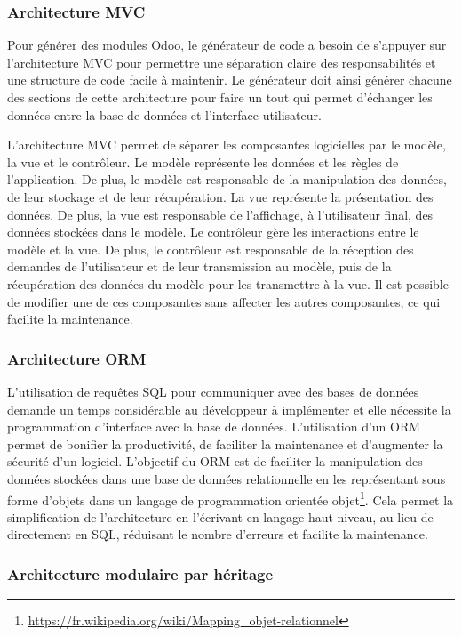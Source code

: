\subsubsection{Architecture MVC}

Pour générer des modules Odoo, le générateur de code a besoin de s'appuyer sur l'architecture MVC pour permettre une séparation claire des responsabilités et une structure de code facile à maintenir. Le générateur doit ainsi générer chacune des sections de cette architecture pour faire un tout qui permet d'échanger les données entre la base de données et l'interface utilisateur.

L’architecture MVC permet de séparer les composantes logicielles par le modèle, la vue et le contrôleur. Le modèle représente les données et les règles de l’application. De plus, le modèle est responsable de la manipulation des données, de leur stockage et de leur récupération. La vue représente la présentation des données. De plus, la vue est responsable de l’affichage, à l’utilisateur final, des données stockées dans le modèle. Le contrôleur gère les interactions entre le modèle et la vue. De plus, le contrôleur est responsable de la réception des demandes de l’utilisateur et de leur transmission au modèle, puis de la récupération des données du modèle pour les transmettre à la vue. Il est possible de modifier une de ces composantes sans affecter les autres composantes, ce qui facilite la maintenance.

\subsubsection{Architecture ORM}

L'utilisation de requêtes SQL pour communiquer avec des bases de données demande un temps considérable au développeur à implémenter et elle nécessite la programmation d'interface avec la base de données. L'utilisation d'un ORM permet de bonifier la productivité, de faciliter la maintenance et d'augmenter la sécurité d'un logiciel. L’objectif du ORM est de faciliter la manipulation des données stockées dans une base de données relationnelle en les représentant sous forme d’objets dans un langage de programmation orientée objet\footnote{\url{https://fr.wikipedia.org/wiki/Mapping_objet-relationnel}}. Cela permet la simplification de l’architecture en l’écrivant en langage haut niveau, au lieu de directement en SQL, réduisant le nombre d'erreurs et facilite la maintenance.

\subsubsection{Architecture modulaire par héritage}

